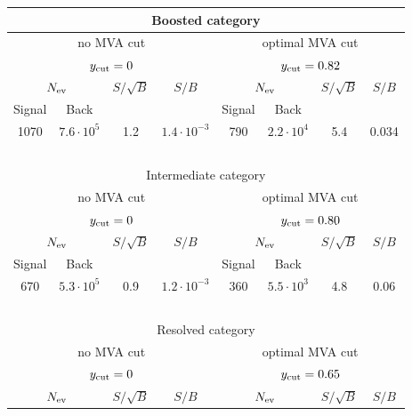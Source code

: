 \begin{table}[t]
  \centering
  \small
  \begin{tabular}{c|c|c|c||c|c|c|c}
    \hline
    \multicolumn{8}{c}{Boosted category}\\
    \hline
    \multicolumn{4}{c||}{no MVA cut} & \multicolumn{4}{c}{optimal MVA cut}\\
    \multicolumn{4}{c||}{$y_{\rm cut}=0$} & \multicolumn{4}{c}{$y_{\rm cut}=0.82$}\\
    \hline
    \multicolumn{2}{c|}{$N_{\rm ev}$} &  $S/\sqrt{B}$  & $S/B$
    & \multicolumn{2}{c|}{$N_{\rm ev}$} &  $S/\sqrt{B}$  & $S/B$\\
        Signal & Back   &     &   &  Signal & Back   &     &    \\
    \hline
      1070   &  $7.6\cdot 10^5$    &  1.2    &  $1.4\cdot 10^{-3}$  & 790 & $2.2\cdot 10^4$ & 5.4  & 0.034\\
      \hline
      \multicolumn{8}{c}{$\quad$}\\
    \hline
    \multicolumn{8}{c}{Intermediate category}\\
    \hline
    \multicolumn{4}{c||}{no MVA cut} & \multicolumn{4}{c}{optimal MVA cut}\\
    \multicolumn{4}{c||}{$y_{\rm cut}=0$} & \multicolumn{4}{c}{$y_{\rm cut}=0.80$}\\
    \hline
    \multicolumn{2}{c|}{$N_{\rm ev}$} &  $S/\sqrt{B}$  & $S/B$
    & \multicolumn{2}{c|}{$N_{\rm ev}$} &  $S/\sqrt{B}$  & $S/B$\\
        Signal & Back   &     &   &  Signal & Back   &     &    \\
    \hline
      670   &   $5.3\cdot 10^5$   &   0.9   &  $1.2\cdot 10^{-3}$ & 360  & $5.5\cdot 10^3$ & 4.8  & $0.06$ \\
      \hline
      \multicolumn{8}{c}{$\quad$}\\
    \hline
    \multicolumn{8}{c}{Resolved category}\\
    \hline
      \multicolumn{4}{c||}{no MVA cut} & \multicolumn{4}{c}{optimal MVA cut}\\
    \multicolumn{4}{c||}{$y_{\rm cut}=0$} & \multicolumn{4}{c}{$y_{\rm cut}=0.65$}\\
    \hline
    \multicolumn{2}{c|}{$N_{\rm ev}$} &  $S/\sqrt{B}$  & $S/B$
    & \multicolumn{2}{c|}{$N_{\rm ev}$} &  $S/\sqrt{B}$  & $S/B$\\

\end{tabular}
\end{table}
